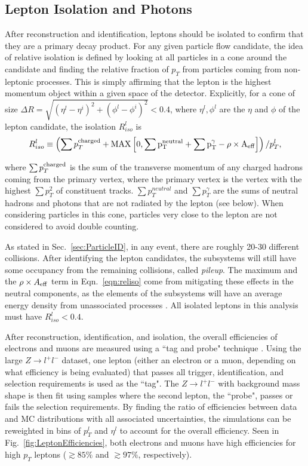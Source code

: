 \subsection{Lepton Isolation and Photons}
\label{sec:zz4lIsolation}

After reconstruction and identification, leptons should be isolated to confirm that they are a primary decay product. For any given particle flow candidate, the idea of relative isolation is defined by looking at all particles in a cone around the candidate and finding the relative fraction of $p_T$ from particles coming from non-leptonic processes. This is simply affirming that the lepton is the highest momentum object within a given space of the detector. Explicitly, for a cone of size $\Delta R = \sqrt{(\eta^l-\eta^i)^2 + (\phi^l-\phi^i)^2} < 0.4$, where $\eta^l,\phi^l$ are the $\eta$ and $\phi$ of the lepton candidate, the isolation $R_{iso}^l$ is
\begin{equation}
\label{eqn:reliso}
R_{iso}^l \equiv \left( \sum p_T^{\rm{charged}} + \rm{MAX}\left[0, \sum p_T^{neutral} + \sum p_T^{\gamma} - \rho\times A_{\rm{eff}}\right] \right) / p_T^{l},
\end{equation}

where $\sum p_T^{\rm{charged}}$ is the sum of the transverse momentum of any charged hadrons coming from the primary vertex, where the primary vertex is the vertex with the highest $\sum p_T^2$ of constituent tracks. $\sum p_T^{neutral}$ and $\sum p_T^{\gamma}$ are the sums of neutral hadrons and photons that are not radiated by the lepton (see below). When considering particles in this cone, particles very close to the lepton are not considered to avoid double counting.

As stated in Sec.~\ref{sec:ParticleID}, in any event, there are roughly 20-30 different collisions. After identifying the lepton candidates, the subsystems will still have some occupancy from the remaining collisions, called \textit{pileup}. The maximum and the $\rho\times A_{\rm{eff}}$ term in Eqn.~\ref{eqn:reliso} come from mitigating these effects in the neutral components, as the elements of the subsystems will have an average energy density from unassociated processes \cite{Cacciari:2007fd,Cacciari:2008gn}. All isolated leptons in this analysis must have $R_{iso}^l < 0.4$.

After reconstruction, identification, and isolation, the overall efficiencies of electrons and muons are measured using a ``tag and probe" technique \cite{MuonTR:2010,CMS_AN_2007-019}. Using the large $Z\rightarrow l^+l^-$ dataset, one lepton (either an electron or a muon, depending on what efficiency is being evaluated) that passes all trigger, identification, and selection requirements is used as the ``tag". The $Z\rightarrow l^+l^-$ with background mass shape is then fit using samples where the second lepton, the ``probe", passes or fails the selection requirements. By finding the ratio of efficiencies between data and MC distributions with all associated uncertainties, the simulations can be reweighted in bins of $p_T^{l}$ and $\eta^l$ to account for the overall efficiency. Seen in Fig.~\ref{fig:LeptonEfficiencies}, both electrons and muons have high efficiencies for high $p_T$ leptons ($\gtrsim85\%$ and $\gtrsim97\%$, respectively).

